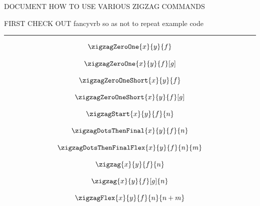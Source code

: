 DOCUMENT HOW TO USE VARIOUS ZIGZAG COMMANDS

FIRST CHECK OUT fancyvrb so as not to repeat example code


\hrule

\begin{showexample}
\[
\arraycolsep=7pt
\zigzagZeroOne{x}{y}{f}
\]
\end{showexample}

\begin{showexample}
\[
\arraycolsep=7pt
\zigzagZeroOne{x}{y}{f}[g]
\]
\end{showexample}

\begin{showexample}
\[
\arraycolsep=7pt
\zigzagZeroOneShort{x}{y}{f}
\]
\end{showexample}

\begin{showexample}
\[
\arraycolsep=7pt
\zigzagZeroOneShort{x}{y}{f}[g]
\]
\end{showexample}

\begin{showexample}
\[
\arraycolsep=7pt
\zigzagStart{x}{y}{f}{n}
\]
\end{showexample}



\begin{showexample}
\[
\arraycolsep=7pt
\zigzagDotsThenFinal{x}{y}{f}{n}
\]
\end{showexample}

\begin{showexample}
\[
\arraycolsep=7pt
\zigzagDotsThenFinalFlex{x}{y}{f}{n}{m}
\]
\end{showexample}

\begin{showexample}
\[
\arraycolsep=7pt
\zigzag{x}{y}{f}{n}
\]
\end{showexample}


\begin{showexample}
\[
\arraycolsep=7pt
\zigzag{x}{y}{f}[g]{n}
\]
\end{showexample}

\begin{showexample}
\[
\arraycolsep=7pt
\zigzagFlex{x}{y}{f}{n}{n+m}
\]
\end{showexample}

